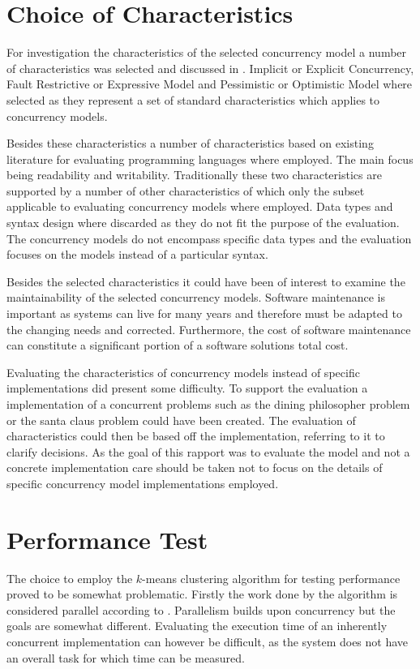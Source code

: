 \section{Choice of Characteristics}
For investigation the characteristics of the selected concurrency model a number of characteristics was selected and discussed in . Implicit or Explicit Concurrency, Fault Restrictive or Expressive Model and Pessimistic or Optimistic Model where selected as they represent a set of standard characteristics which applies to concurrency models.

Besides these characteristics a number of characteristics based on existing literature for evaluating programming languages where employed. The main focus being readability and writability. Traditionally these two characteristics are supported by a number of other characteristics of which only the subset applicable to evaluating concurrency models where employed. Data types and syntax design where discarded as they do not fit the purpose of the evaluation. The concurrency models do not encompass specific data types and the evaluation focuses on the models instead of a particular syntax.

Besides the selected characteristics it could have been of interest to examine the maintainability of the selected concurrency models. Software maintenance is important as systems can live for many years and therefore must be adapted to the changing needs and corrected. Furthermore, the cost of software maintenance can constitute a significant portion of a software solutions total cost\cite[p. 17]{sebestaProLang}.

Evaluating the characteristics of concurrency models instead of specific implementations did present some difficulty. To support the evaluation a implementation of a concurrent problems such as the dining philosopher problem\cite[p. 673]{hoare1978communicating} or the santa claus problem\cite{trono1994new} could have been created. The evaluation of characteristics could then be based off the implementation, referring to it to clarify decisions. As the goal of this rapport was to evaluate the model and not a concrete implementation care should be taken not to focus on the details of specific concurrency model implementations employed.

\section{Performance Test}\label{sec:reflec_perf_test}
The choice to employ the $k$-means clustering algorithm for testing performance proved to be somewhat problematic. Firstly the work done by the algorithm is considered parallel according to . Parallelism builds upon concurrency but the goals are somewhat different. Evaluating the execution time of an inherently concurrent implementation can however be difficult, as the system does not have an overall task for which time can be measured.

